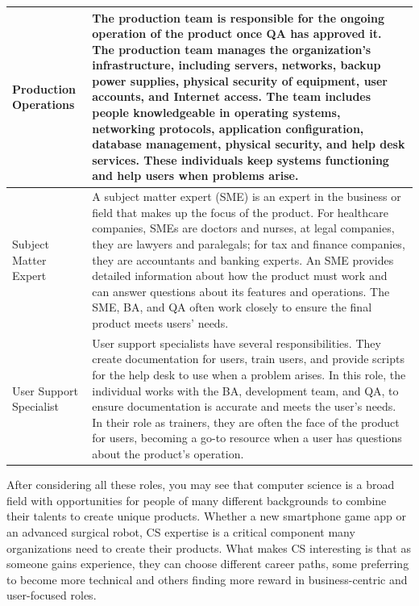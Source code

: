 \begin{longtable}[H]{p{.8in}|p{3.6in}}
	\hline
	\Tstrut Production Operations  & The production team is responsible for the ongoing operation of the product once QA has approved it. The production team manages the organization's infrastructure, including servers, networks, backup power supplies, physical security of equipment, user accounts, and Internet access. The team includes people knowledgeable in operating systems, networking protocols, application configuration, database management, physical security, and help desk services. These individuals keep systems functioning and help users when problems arise.\\
	\hline
	\Tstrut Subject \linebreak Matter \linebreak Expert & A subject matter expert (SME) is an expert in the business or field that makes up the focus of the product. For healthcare companies, SMEs are doctors and nurses, at legal companies, they are lawyers and paralegals; for tax and finance companies, they are accountants and banking experts. An SME provides detailed information about how the product must work and can answer questions about its features and operations. The SME, BA, and QA often work closely to ensure the final product meets users' needs.\\
	\hline
	\Tstrut User \linebreak Support \linebreak Specialist & User support specialists have several responsibilities. They create documentation for users, train users, and provide scripts for the help desk to use when a problem arises. In this role, the individual works with the BA, development team, and QA, to ensure documentation is accurate and meets the user's needs. In their role as trainers, they are often the face of the product for users, becoming a go-to resource when a user has questions about the product's operation.\\ 
	\bottomrule
\end{longtable}


After considering all these roles, you may see that computer science is a broad field with opportunities for people of many different backgrounds to combine their talents to create unique products. Whether a new smartphone game app or an advanced surgical robot, CS expertise is a critical component many organizations need to create their products. What makes CS interesting is that as someone gains experience, they can choose different career paths, some preferring to become more technical and others finding more reward in business-centric and user-focused roles.

